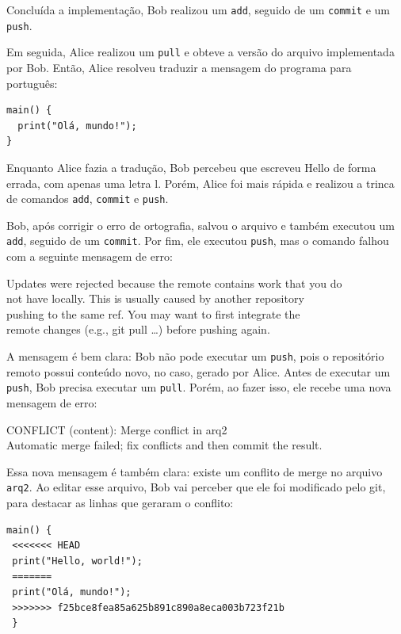 \documentclass[
  11pt,
  twoside]{book}
\newcommand{\passthrough}[1]{#1}
\begin{document}
Concluída a implementação, Bob realizou um
\passthrough{\lstinline!add!}, seguido de um
\passthrough{\lstinline!commit!} e um \passthrough{\lstinline!push!}.

Em seguida, Alice realizou um \passthrough{\lstinline!pull!} e obteve a
versão do arquivo implementada por Bob. Então, Alice resolveu traduzir a
mensagem do programa para português:

\begin{lstlisting}
main() {
  print("Olá, mundo!");
}
\end{lstlisting}

Enquanto Alice fazia a tradução, Bob percebeu que escreveu Hello de
forma errada, com apenas uma letra l. Porém, Alice foi mais rápida e
realizou a trinca de comandos \passthrough{\lstinline!add!},
\passthrough{\lstinline!commit!} e \passthrough{\lstinline!push!}.

Bob, após corrigir o erro de ortografia, salvou o arquivo e também
executou um \passthrough{\lstinline!add!}, seguido de um
\passthrough{\lstinline!commit!}. Por fim, ele executou
\passthrough{\lstinline!push!}, mas o comando falhou com a seguinte
mensagem de erro:

Updates were rejected because the remote contains work that you do\\
not have locally. This is usually caused by another repository\\
pushing to the same ref. You may want to first integrate the\\
remote changes (e.g., git pull \ldots) before pushing again.

A mensagem é bem clara: Bob não pode executar um
\passthrough{\lstinline!push!}, pois o repositório remoto possui
conteúdo novo, no caso, gerado por Alice. Antes de executar um
\passthrough{\lstinline!push!}, Bob precisa executar um
\passthrough{\lstinline!pull!}. Porém, ao fazer isso, ele recebe uma
nova mensagem de erro:

CONFLICT (content): Merge conflict in arq2\\
Automatic merge failed; fix conflicts and then commit the result.

Essa nova mensagem é também clara: existe um conflito de merge no
arquivo \passthrough{\lstinline!arq2!}. Ao editar esse arquivo, Bob vai
perceber que ele foi modificado pelo git, para destacar as linhas que
geraram o conflito:

\begin{lstlisting}
main() {                                                
 <<<<<<< HEAD                                     
 print("Hello, world!");                               
 =======                                                 
 print("Olá, mundo!");                                 
 >>>>>>> f25bce8fea85a625b891c890a8eca003b723f21b 
 }                                                       
\end{lstlisting}
\end{document}
